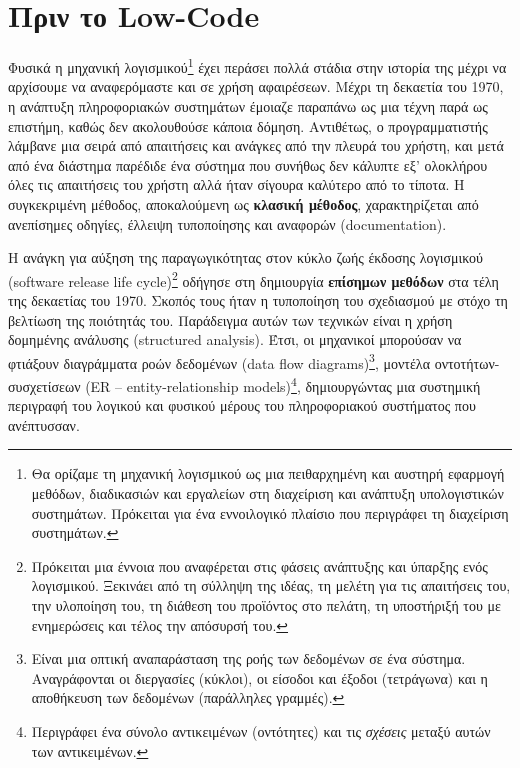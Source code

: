         \begin{displayquote} \justifying
             \cite{Ibm_2024}
        \end{displayquote}

    \section{Πριν το Low-Code}
        Φυσικά η μηχανική λογισμικού\footnote{Θα ορίζαμε τη μηχανική λογισμικού ως μια πειθαρχημένη και αυστηρή εφαρμογή μεθόδων, διαδικασιών και εργαλείων στη διαχείριση και ανάπτυξη υπολογιστικών συστημάτων. Πρόκειται για ένα εννοιλογικό πλαίσιο που περιγράφει τη διαχείριση συστημάτων.} έχει περάσει πολλά στάδια στην ιστορία της μέχρι να αρχίσουμε να αναφερόμαστε και σε χρήση αφαιρέσεων. Μέχρι τη δεκαετία του 1970, η ανάπτυξη πληροφοριακών συστημάτων έμοιαζε παραπάνω ως μια τέχνη παρά ως επιστήμη, καθώς δεν ακολουθούσε κάποια δόμηση. Αντιθέτως, ο προγραμματιστής λάμβανε μια σειρά από απαιτήσεις και ανάγκες από την πλευρά του χρήστη, και μετά από ένα διάστημα παρέδιδε ένα σύστημα που συνήθως δεν κάλυπτε εξ' ολοκλήρου όλες τις απαιτήσεις του χρήστη αλλά ήταν σίγουρα καλύτερο από το τίποτα. Η συγκεκριμένη μέθοδος, αποκαλούμενη ως \textbf{κλασική μέθοδος}, χαρακτηρίζεται από ανεπίσημες οδηγίες, έλλειψη τυποποίησης και αναφορών (documentation).

        Η ανάγκη για αύξηση της παραγωγικότητας στον κύκλο ζωής έκδοσης λογισμικού (software release life cycle)\footnote{Πρόκειται μια έννοια που αναφέρεται στις φάσεις ανάπτυξης και ύπαρξης ενός λογισμικού. Ξεκινάει από τη σύλληψη της ιδέας, τη μελέτη για τις απαιτήσεις του, την υλοποίηση του, τη διάθεση του προϊόντος στο πελάτη, τη υποστήριξή του με ενημερώσεις και τέλος την απόσυρσή του.} οδήγησε στη δημιουργία \textbf{επίσημων μεθόδων} στα τέλη της δεκαετίας του 1970. Σκοπός τους ήταν η τυποποίηση του σχεδιασμού με στόχο τη βελτίωση της ποιότητάς του. Παράδειγμα αυτών των τεχνικών είναι η χρήση δομημένης ανάλυσης (structured analysis). Έτσι, οι μηχανικοί μπορούσαν να φτιάξουν διαγράμματα ροών δεδομένων (data flow diagrams)\footnote{Είναι μια οπτική αναπαράσταση της ροής των δεδομένων σε ένα σύστημα. Αναγράφονται οι διεργασίες (κύκλοι), οι είσοδοι και έξοδοι (τετράγωνα) και η αποθήκευση των δεδομένων (παράλληλες γραμμές).}, μοντέλα οντοτήτων-συσχετίσεων (ER -- entity-relationship models)\footnote{Περιγράφει ένα σύνολο αντικειμένων (οντότητες) και τις \textit{σχέσεις} μεταξύ αυτών των αντικειμένων.}, δημιουργώντας μια συστημική περιγραφή του λογικού και φυσικού μέρους του πληροφοριακού συστήματος που ανέπτυσσαν.

